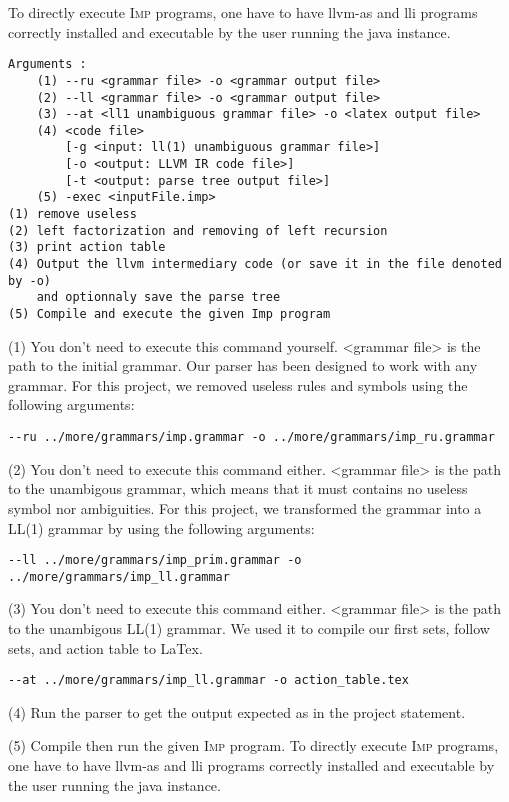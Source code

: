 \documentclass[11pt]{article}
\newcommand\imp{\textsc{Imp}\xspace}
\begin{document}
To directly execute \imp programs, one have to have \textsf{llvm-as} and \textsf{lli} programs correctly installed and
executable by the user running the java instance.

{\small
\begin{lstlisting}
Arguments :
    (1) --ru <grammar file> -o <grammar output file>
    (2) --ll <grammar file> -o <grammar output file>
    (3) --at <ll1 unambiguous grammar file> -o <latex output file>
    (4) <code file>
        [-g <input: ll(1) unambiguous grammar file>]
        [-o <output: LLVM IR code file>]
        [-t <output: parse tree output file>]
    (5) -exec <inputFile.imp>
(1) remove useless
(2) left factorization and removing of left recursion
(3) print action table
(4) Output the llvm intermediary code (or save it in the file denoted by -o)
    and optionnaly save the parse tree
(5) Compile and execute the given Imp program
\end{lstlisting}}

(1) You don't need to execute this command yourself. <grammar file> is the path to the initial grammar.
Our parser has been designed to work with any grammar. For this project, we removed useless rules and symbols
using the following arguments:
\begin{lstlisting}
--ru ../more/grammars/imp.grammar -o ../more/grammars/imp_ru.grammar
\end{lstlisting}

(2) You don't need to execute this command either. <grammar file> is the path to the unambigous grammar, which
means that it must contains no useless symbol nor ambiguities.
For this project, we transformed the grammar into a LL(1) grammar by using the following arguments:
\begin{lstlisting}
--ll ../more/grammars/imp_prim.grammar -o ../more/grammars/imp_ll.grammar
\end{lstlisting}

(3) You don't need to execute this command either. <grammar file> is the path to the unambigous LL(1) grammar.
We used it to compile our first sets, follow sets, and action table to LaTex.
\begin{lstlisting}
--at ../more/grammars/imp_ll.grammar -o action_table.tex
\end{lstlisting}

(4) Run the parser to get the output expected as in the project statement.

(5) Compile then run the given \imp program.
To directly execute \imp programs, one have to have \textsf{llvm-as} and \textsf{lli} programs correctly installed and
executable by the user running the java instance.
\end{document}
